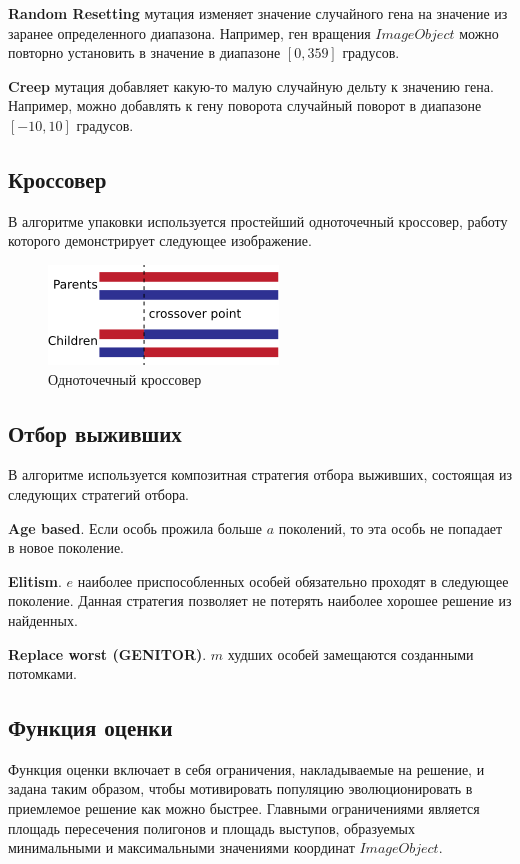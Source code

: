 \documentclass{fefu_thesis/cls/fefu}
\begin{document}
    \textbf{Random Resetting} мутация изменяет значение случайного гена на значение из заранее определенного диапазона. Например, ген вращения $ImageObject$ можно повторно установить в значение в диапазоне $\left[0, 359\right]$ градусов.

    \textbf{Creep} мутация добавляет какую-то малую случайную дельту к значению гена. Например, можно добавлять к гену поворота случайный поворот в диапазоне $\left[-10, 10\right]$ градусов.

    \subsection{Кроссовер}

    В алгоритме упаковки используется простейший одноточечный кроссовер, работу которого демонстрирует следующее изображение.

    \begin{figure}[H]
        \centering
        \includegraphics[scale=1]{images/OnePointCrossover.png}
        \caption{Одноточечный кроссовер}
    \end{figure}

    \subsection{Отбор выживших}
    В алгоритме используется композитная стратегия отбора выживших, состоящая из следующих стратегий отбора.

    \textbf{Age based}. Если особь прожила больше $a$ поколений, то эта особь не попадает в новое поколение.

    \textbf{Elitism}. $e$ наиболее приспособленных особей обязательно проходят в следующее поколение. Данная стратегия позволяет не потерять наиболее хорошее решение из найденных.

    \textbf{Replace worst (GENITOR)}. $m$ худших особей замещаются созданными потомками.

    \subsection{Функция оценки}

    Функция оценки включает в себя ограничения, накладываемые на решение, и задана таким образом, чтобы мотивировать популяцию эволюционировать в приемлемое решение как можно быстрее. Главными ограничениями является площадь пересечения полигонов и площадь выступов, образуемых минимальными и максимальными значениями координат $ImageObject$.
\end{document}
